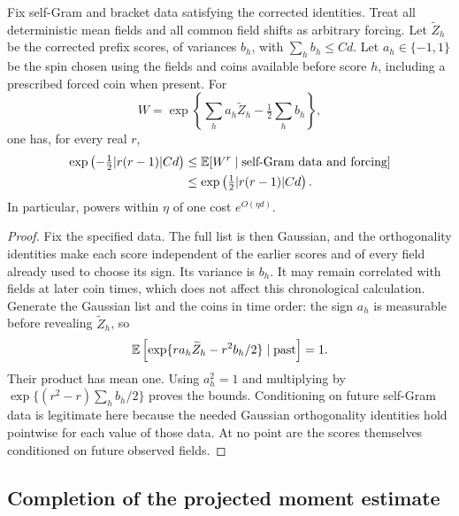 \begin{lemma}
\label{lem:row-adapted-gaussian}
Fix self-Gram and bracket data satisfying the corrected identities.
Treat all deterministic mean fields and all common field shifts as
arbitrary forcing.  Let $\widetilde Z_h$ be the corrected prefix
scores, of variances $b_h$, with $\sum_h b_h\le Cd$.
Let $a_h\in\{-1,1\}$ be the spin chosen using the fields and coins
available before score $h$, including a prescribed forced coin when
present.  For
\[
 W=\exp\left\{\sum_h a_h\widetilde Z_h
                         -\tfrac12\sum_h b_h\right\},
\]
one has, for every real $r$,
\begin{equation}
 \begin{aligned}
 \exp\left(-\tfrac12|r(r-1)|Cd\right)
 &\le\mathbb E[W^r\mid\text{self-Gram data and forcing}]\\
 &\le\exp\left(\tfrac12|r(r-1)|Cd\right).
 \end{aligned}
 \label{eq:row-near-one}
\end{equation}
In particular, powers within $\eta$ of one cost $e^{O(\eta d)}$.
\end{lemma}

\begin{proof}
Fix the specified data.  The full list is then Gaussian, and the
orthogonality identities make each score independent of the earlier
scores and of every field already used to choose its sign.  Its
variance is $b_h$.  It may remain correlated with fields at later coin
times, which does not affect this chronological calculation.  Generate
the Gaussian list and the coins in time order: the sign $a_h$ is
measurable before revealing $\widetilde Z_h$, so
\[
 \mathbb E\left[\exp\{r a_h\widetilde Z_h-r^2b_h/2\}
                      \mid\text{past}\right]=1.
\]
Their product has mean one.  Using $a_h^2=1$ and multiplying by
$\exp\{(r^2-r)\sum_hb_h/2\}$ proves the bounds.  Conditioning on
future self-Gram data is legitimate here because the needed Gaussian
orthogonality identities hold pointwise for each value of those data.
At no point are the scores themselves conditioned on future observed
fields.
\end{proof}

\subsection{Completion of the projected moment estimate}

